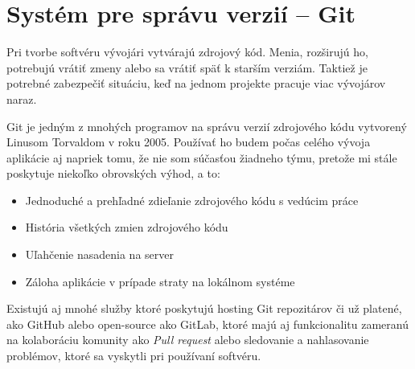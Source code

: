 \section{Systém pre správu verzií -- Git}

Pri tvorbe softvéru vývojári vytvárajú zdrojový kód. Menia, rozširujú ho, potrebujú vrátiť zmeny alebo sa vrátiť späť k starším verziám. Taktiež je potrebné zabezpečiť situáciu, keď na jednom projekte pracuje viac vývojárov naraz. \citep{otte2009version} 

Git je jedným z mnohých programov na správu verzií zdrojového kódu vytvorený Linusom Torvaldom v roku 2005. Používať ho budem počas celého vývoja aplikácie aj napriek tomu, že nie som súčasťou žiadneho týmu, pretože mi stále poskytuje niekoľko obrovských výhod, a to: 

\begin{itemize}
    \item Jednoduché a prehľadné zdieľanie zdrojového kódu s vedúcim práce
    \item História všetkých zmien zdrojového kódu
    \item Uľahčenie nasadenia na server
    \item Záloha aplikácie v prípade straty na lokálnom systéme
\end{itemize}

Existujú aj mnohé služby ktoré poskytujú hosting Git repozitárov či už platené, ako GitHub alebo open-source ako GitLab, ktoré majú aj funkcionalitu zameranú na kolaboráciu komunity ako \emph{Pull request} alebo sledovanie a nahlasovanie problémov, ktoré sa vyskytli pri používaní softvéru.